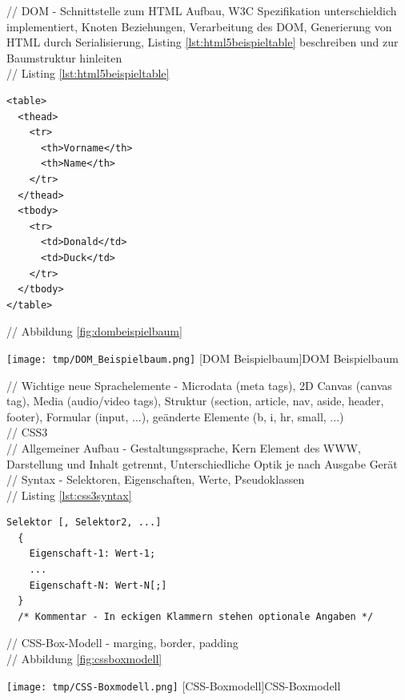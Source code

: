\documentclass[12pt,a4paper,bibliography=totocnumbered,listof=totocnumbered]{scrartcl}
\begin{document}
// DOM - Schnittstelle zum HTML Aufbau, W3C Spezifikation unterschieldich implementiert, Knoten Beziehungen, Verarbeitung des DOM, Generierung von HTML durch Serialisierung, Listing \ref{lst:html5beispieltable} beschreiben und zur Baumstruktur hinleiten\\
// Listing \ref{lst:html5beispieltable}
	\vspace{1em}
	\begin{lstlisting}[caption=HTML5 Beispiel Definition, label=lst:html5beispieltable]
<table>
  <thead>
    <tr>
      <th>Vorname</th>
      <th>Name</th>
    </tr>
  </thead>
  <tbody>
    <tr>
      <td>Donald</td>
      <td>Duck</td>
    </tr>
  </tbody>
</table>
	\end{lstlisting}

// Abbildung \ref{fig:dombeispielbaum}\\
	\vspace{1em}
	\begin{minipage}{\linewidth}
		\centering
		\texttt{[image: tmp/DOM\_Beispielbaum.png]}
		[DOM Beispielbaum]{DOM Beispielbaum}
		\label{fig:dombeispielbaum}
	\end{minipage}

// Wichtige neue Sprachelemente - Microdata (meta tags), 2D Canvas (canvas tag), Media (audio/video tags), Struktur (section, article, nav, aside, header, footer), Formular (input, ...), geänderte Elemente (b, i, hr, small, ...)\\

// CSS3\\
// Allgemeiner Aufbau - Gestaltungssprache, Kern Element des WWW, Darstellung und Inhalt getrennt, Unterschiedliche Optik je nach Ausgabe Gerät\\
// Syntax - Selektoren, Eigenschaften, Werte, Pseudoklassen\\
// Listing \ref{lst:css3syntax}
	\vspace{1em}
	\begin{lstlisting}[caption=CSS3 Syntax Beispiel, label=lst:css3syntax]
Selektor [, Selektor2, ...]
  {
    Eigenschaft-1: Wert-1;
    ...
    Eigenschaft-N: Wert-N[;]
  }
  /* Kommentar - In eckigen Klammern stehen optionale Angaben */
	\end{lstlisting}

// CSS-Box-Modell - marging, border, padding\\
// Abbildung \ref{fig:cssboxmodell}\\
	\vspace{1em}
	\begin{minipage}{\linewidth}
		\centering
		\texttt{[image: tmp/CSS-Boxmodell.png]}
		[CSS-Boxmodell]{CSS-Boxmodell\footnotemark }
		\label{fig:cssboxmodell}
	\end{minipage}
	
\end{document}
